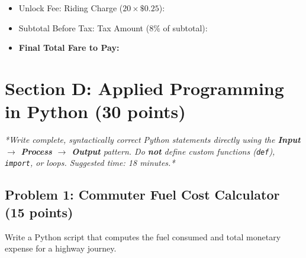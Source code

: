 \documentclass[11pt,a4paper]{article}
\begin{document}
\begin{itemize}[noitemsep]

  \item Unlock Fee: \underline{\hspace{3cm}} \hfill Riding Charge ($20 \times \$0.25$): \underline{\hspace{3cm}}

  \item Subtotal Before Tax: \underline{\hspace{3cm}} \hfill Tax Amount ($8\%$ of subtotal): \underline{\hspace{3cm}}

  \item \textbf{Final Total Fare to Pay:} \underline{\hspace{3.5cm}}

\end{itemize}





\newpage

\section*{Section D: Applied Programming in Python \hfill \normalsize\normalfont(30 points)}

\textit{*Write complete, syntactically correct Python statements directly using the \textbf{Input $\rightarrow$ Process $\rightarrow$ Output} pattern. Do \textbf{not} define custom functions (\texttt{def}), \texttt{import}, or loops. Suggested time: 18 minutes.*}

\vspace{0.08cm}

\subsection*{Problem 1: Commuter Fuel Cost Calculator (15 points)}

Write a Python script that computes the fuel consumed and total monetary expense for a highway journey.
\end{document}
